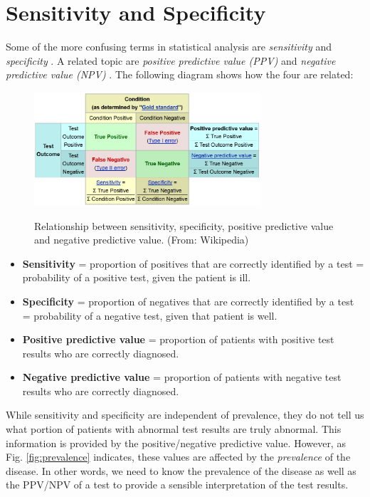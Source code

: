 \section{Sensitivity and Specificity}

Some of the more confusing terms in statistical analysis are \emph{sensitivity}  and \emph{specificity} . A related topic are \emph{positive predictive value (PPV)}  and \emph{negative predictive value (NPV)} . The following diagram shows how the four are related:

\begin{figure}[ht]
  \centering
  \includegraphics[width=0.75\textwidth]{../Images/Sensitivity_Specificity_Diagram.png}\\
  \caption{Relationship between sensitivity, specificity, positive predictive value and negative predictive value. (From: Wikipedia)}\label{fig:sens_spec_diagram}
\end{figure}

\begin{itemize}
  \item \textbf{Sensitivity} = proportion of positives that are correctly identified by a test = probability of a positive test, given the patient is ill.
  \item \textbf{Specificity} = proportion of negatives that are correctly identified by a test = probability of a negative test, given that patient is well.
  \item \textbf{Positive predictive value} = proportion of patients with positive test results who are correctly diagnosed.
  \item \textbf{Negative predictive value} = proportion of patients with negative test results who are correctly diagnosed.
\end{itemize}

While sensitivity and specificity are independent of prevalence, they do not tell us what portion of patients with abnormal test results are truly abnormal. This information is provided by the positive/negative predictive value. However, as Fig. \ref{fig:prevalence} indicates, these values are affected by the \emph{prevalence}  of the disease. In other words, we need to know the prevalence of the disease as well as the PPV/NPV of a test to provide a sensible interpretation of the test results.

